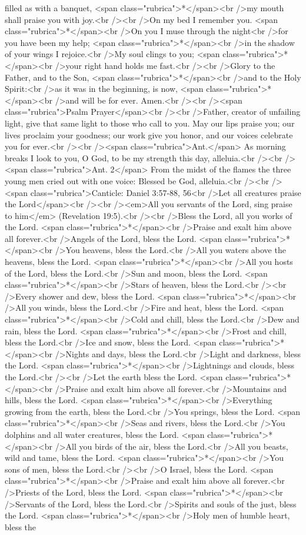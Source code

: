 filled as with a banquet, <span class="rubrica">*</span><br />my mouth shall praise you with joy.<br /><br />On my bed I remember you. <span class="rubrica">*</span><br />On you I muse through the night<br />for you have been my help; <span class="rubrica">*</span><br />in the shadow of your wings I rejoice.<br />My soul clings to you; <span class="rubrica">*</span><br />your right hand holds me fast.<br /><br />Glory to the Father, and to the Son, <span class="rubrica">*</span><br />and to the Holy Spirit:<br />as it was in the beginning, is now, <span class="rubrica">*</span><br />and will be for ever. Amen.<br /><br /><span class="rubrica">Psalm Prayer</span><br /><br />Father, creator of unfailing light, give that same light to those who call to you. May our lips praise you; our lives proclaim your goodness; our work give you honor, and our voices celebrate you for ever.<br /><br /><span class="rubrica">Ant.</span> As morning breaks I look to you, O God, to be my strength this day, alleluia.<br /><br /><span class="rubrica">Ant. 2</span> From the midst of the flames the three young men cried out with one voice: Blessed be God, alleluia.<br /><br /><span class="rubrica">Canticle: Daniel 3:57-88, 56<br />Let all creatures praise the Lord</span><br /><br /><em>All you servants of the Lord, sing praise to him</em> (Revelation 19:5).<br /><br />Bless the Lord, all you works of the Lord. <span class="rubrica">*</span><br />Praise and exalt him above all forever.<br />Angels of the Lord, bless the Lord. <span class="rubrica">*</span><br />You heavens, bless the Lord.<br />All you waters above the heavens, bless the Lord. <span class="rubrica">*</span><br />All you hosts of the Lord, bless the Lord.<br />Sun and moon, bless the Lord. <span class="rubrica">*</span><br />Stars of heaven, bless the Lord.<br /><br />Every shower and dew, bless the Lord. <span class="rubrica">*</span><br />All you winds, bless the Lord.<br />Fire and heat, bless the Lord. <span class="rubrica">*</span><br />Cold and chill, bless the Lord.<br />Dew and rain, bless the Lord. <span class="rubrica">*</span><br />Frost and chill, bless the Lord.<br />Ice and snow, bless the Lord. <span class="rubrica">*</span><br />Nights and days, bless the Lord.<br />Light and darkness, bless the Lord. <span class="rubrica">*</span><br />Lightnings and clouds, bless the Lord.<br /><br />Let the earth bless the Lord. <span class="rubrica">*</span><br />Praise and exalt him above all forever.<br />Mountains and hills, bless the Lord. <span class="rubrica">*</span><br />Everything growing from the earth, bless the Lord.<br />You springs, bless the Lord. <span class="rubrica">*</span><br />Seas and rivers, bless the Lord.<br />You dolphins and all water creatures, bless the Lord. <span class="rubrica">*</span><br />All you birds of the air, bless the Lord.<br />All you beasts, wild and tame, bless the Lord. <span class="rubrica">*</span><br />You sons of men, bless the Lord.<br /><br />O Israel, bless the Lord. <span class="rubrica">*</span><br />Praise and exalt him above all forever.<br />Priests of the Lord, bless the Lord. <span class="rubrica">*</span><br />Servants of the Lord, bless the Lord.<br />Spirits and souls of the just, bless the Lord. <span class="rubrica">*</span><br />Holy men of humble heart, bless the 